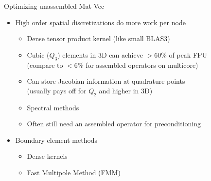 \begin{frame}{Optimizing unassembled Mat-Vec}
  \begin{itemize}
  \item High order spatial discretizations do more work per node
    \begin{itemize}
    \item Dense tensor product kernel (like small BLAS3)
    \item Cubic ($Q_3$) elements in 3D can achieve $>60\%$ of peak FPU \\
      (compare to $< 6\%$ for assembled operators on multicore)
    \item Can store Jacobian information at quadrature points \\
      (usually pays off for $Q_2$ and higher in 3D)
    \item Spectral methods
    \item Often still need an assembled operator for preconditioning
    \end{itemize}
  \item Boundary element methods
    \begin{itemize}
    \item Dense kernels
    \item Fast Multipole Method (FMM)
    \end{itemize}
  \end{itemize}
\end{frame}
